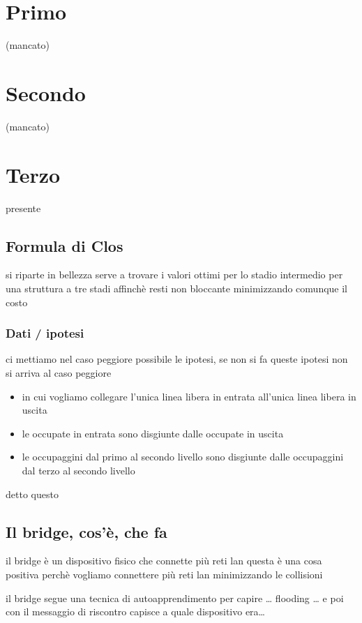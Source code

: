 \documentclass[11pt]{article}
\author{Biggie Dickus}
\date{\today}
\title{}
\begin{document}
\tableofcontents

\section{Primo}
\label{sec:org5a10a8a}
(mancato)

\section{Secondo}
\label{sec:org985a268}
(mancato)

\section{Terzo}
\label{sec:org4fd035f}
presente
\subsection{Formula di Clos}
\label{sec:org8fa4c16}
si riparte in bellezza
serve a trovare i valori ottimi per lo stadio intermedio per una struttura a tre stadi affinchè resti non bloccante minimizzando comunque il costo

\subsubsection{Dati / ipotesi}
\label{sec:org7b8596f}
ci mettiamo nel caso peggiore possibile
le ipotesi, se non si fa queste ipotesi non si arriva al caso peggiore
\begin{itemize}
\item in cui vogliamo collegare l'unica linea libera in entrata all'unica linea libera in uscita
\item le occupate in entrata sono disgiunte dalle occupate in uscita
\item le occupaggini dal primo al secondo livello sono disgiunte dalle occupaggini dal terzo al secondo livello
\end{itemize}

detto questo

\subsection{Il bridge, cos'è, che fa}
\label{sec:org92a194f}
il bridge è un dispositivo fisico che connette più reti lan
questa è una cosa positiva perchè vogliamo connettere più reti lan minimizzando le collisioni

il bridge segue una tecnica di autoapprendimento per capire \ldots{}
flooding \ldots{}
e poi con il messaggio di riscontro capisce a quale dispositivo era\ldots{}
\end{document}

